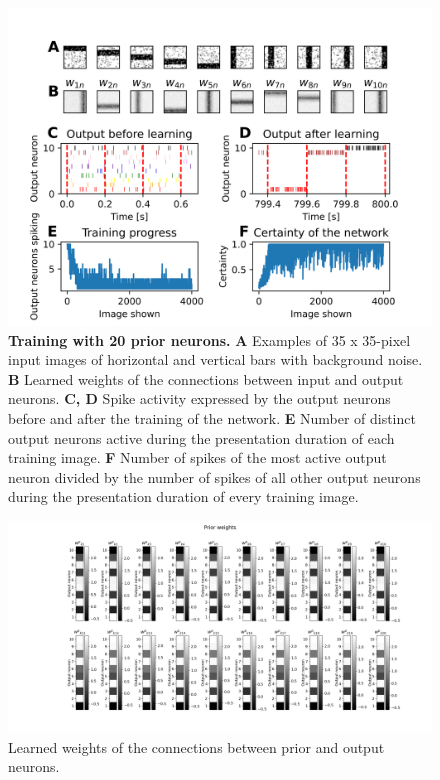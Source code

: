 \begin{figure}
  \includegraphics[width=\linewidth]{figures/horvertAdaptiveInh/trainingPlot.png}
  \caption{\textbf{Training with 20 prior neurons.} \textbf{A} Examples of 35 x 35-pixel input images of horizontal and vertical bars with background noise. \textbf{B} Learned weights of the connections between input and output neurons. \textbf{C, D} Spike activity expressed by the output neurons before and after the training of the network. \textbf{E} Number of distinct output neurons active during the presentation duration of each training image. \textbf{F} Number of spikes of the most active output neuron divided by the number of spikes of all other output neurons during the presentation duration of every training image.}
  \label{fig:horvertAdaptiveInhibitionTraining}
\end{figure}

\begin{figure}
  \includegraphics[width=\linewidth]{figures/horvertAdaptiveInh/priorWeights.png}
  \caption{ Learned weights of the connections between prior and output neurons. }
  \label{fig:horvertAdaptiveInhibitionpriorWeights}
\end{figure}

